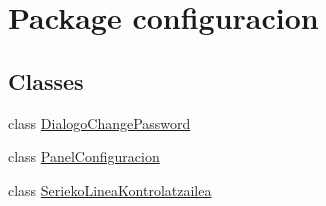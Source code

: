 \hypertarget{namespaceconfiguracion}{}\section{Package configuracion}
\label{namespaceconfiguracion}
\subsection*{Classes}
\begin{DoxyCompactItemize}
\item 
class \mbox{\hyperlink{classconfiguracion_1_1_dialogo_change_password}{Dialogo\+Change\+Password}}
\item 
class \mbox{\hyperlink{classconfiguracion_1_1_panel_configuracion}{Panel\+Configuracion}}
\item 
class \mbox{\hyperlink{classconfiguracion_1_1_serieko_linea_kontrolatzailea}{Serieko\+Linea\+Kontrolatzailea}}
\end{DoxyCompactItemize}
